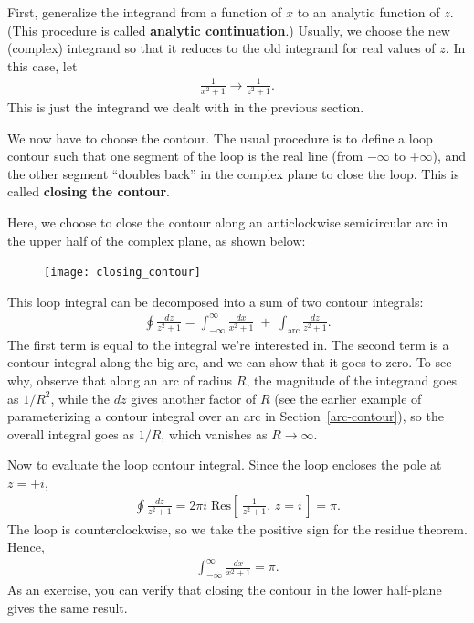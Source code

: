 \documentclass[10pt,a4paper]{article}
\begin{document}
First, generalize the integrand from a function of $x$ to an analytic
function of $z$.  (This procedure is called \textbf{analytic
  continuation}.)  Usually, we choose the new (complex) integrand so
that it reduces to the old integrand for real values of $z$. In this
case, let
\begin{align}
  \frac{1}{x^2 + 1} \rightarrow \frac{1}{z^2 + 1}.
\end{align}
This is just the integrand we dealt with in the previous section.

We now have to choose the contour.  The usual procedure is to define a
loop contour such that one segment of the loop is the real line (from
$-\infty$ to $+\infty$), and the other segment ``doubles back'' in the
complex plane to close the loop.  This is called \textbf{closing the
  contour}.

Here, we choose to close the contour along an anticlockwise
semicircular arc in the upper half of the complex plane, as shown
below:

\begin{figure}[ht]
  \centering\texttt{[image: closing\_contour]}
\end{figure}

\noindent
This loop integral can be decomposed into a sum of two contour integrals:
\begin{align}
  \oint \frac{dz}{z^2 + 1} = \int_{-\infty}^\infty \frac{dx}{x^2 + 1} \;+\; \int_{\mathrm{arc}} \frac{dz}{z^2 + 1}.
\end{align}
The first term is equal to the integral we're interested in. The
second term is a contour integral along the big arc, and we can show
that it goes to zero.  To see why, observe that along an arc of radius
$R$, the magnitude of the integrand goes as $1/R^{2}$, while the $dz$
gives another factor of $R$ (see the earlier example of parameterizing
a contour integral over an arc in Section~\ref{arc-contour}), so the
overall integral goes as $1/R$, which vanishes as $R \rightarrow
\infty$.

Now to evaluate the loop contour integral. Since the loop encloses the
pole at $z = +i$,
\begin{align}
  \oint \frac{dz}{z^2+1} = 2\pi i \; \mathrm{Res}\left[\,\frac{1}{z^2 + 1}, \, z = i\,\right] = \pi.
\end{align}
The loop is counterclockwise, so we take the positive sign for the
residue theorem. Hence,
\begin{align}
  \int_{-\infty}^\infty \frac{dx}{x^2 + 1} = \pi.
\end{align}
As an exercise, you can verify that closing the contour in the lower
half-plane gives the same result.
\end{document}
